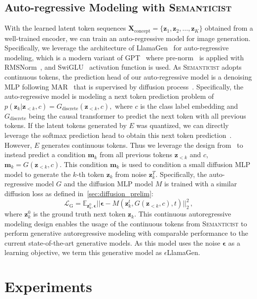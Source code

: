 \documentclass[10pt,twocolumn,letterpaper]{article}
\DeclareRobustCommand{\modelname}{\textsc{Semanticist}\xspace}
\DeclareRobustCommand{\armodelname}{$\epsilon$LlamaGen\xspace}
\begin{document}
\subsection{Auto-regressive Modeling with \bf\modelname}
With the learned latent token sequences $\bm{X}_{\text{concept}}=\{\bm{z}_1, \bm{z}_2, \dots, \bm{z}_K\}$ obtained from a well-trained encoder, we can train an auto-regressive model for image generation.
Specifically, we leverage the architecture of LlamaGen~\cite{llamagen} for auto-regressive modeling, which is a modern variant of GPT~\cite{radford2018improving} where pre-norm~\cite{prenorm} is applied with RMSNorm~\cite{rmsnorm}, and SwiGLU~\cite{swiglu} activation function is used.
As \modelname adopts continuous tokens, the prediction head of our auto-regressive model is a denoising MLP following MAR~\cite{mar} that is supervised by diffusion process~\cite{DDPM}.
Specifically, the auto-regressive model is modeling a next token prediction problem of $p(\bm{z}_k|\bm{z}_{<k}, c)=G_{\text{discrete}}(\bm{z}_{<k}, c),$ where $c$ is the class label embedding and $G_{\text{discrete}}$ being the causal transformer to predict the next token with all previous tokens.
If the latent tokens generated by $E$ was quantized, we can directly leverage the softmax prediction head to obtain this next token prediction~\cite{llamagen}.
However, $E$ generates continuous tokens. Thus we leverage the design from~\cite{mar} to instead predict a condition $\bm{m}_k$ from all previous tokens $\bm{z}_{<k}$ and $c$, $\bm{m}_k = G(\bm{z}_{<k}, c)$.
This condition $\bm{m}_k$ is used to condition a small diffusion MLP model to generate the $k$-th token $\bm{z}_k$ from noise $\bm{z}_k^T$.
Specifically, the auto-regressive model $G$ and the diffusion MLP model $M$ is trained with a similar diffusion loss as defined in~\cref{sec:diffusion_prelim}:
\begin{equation}
    \mathcal{L}_{\text{G}} = \mathbb{E}_{\bm{z}_k^0, \bm{\epsilon}}||\bm{\epsilon}-M(\bm{z}_k^t, G(\bm{z}_{<k}, c), t)||^2_2 \,, \nonumber
\end{equation}
where $\bm{z}_k^0$ is the ground truth next token $\bm{z}_k$.
This continuous autoregressive modeling design enables the usage of the continuous tokens from \modelname to perform generative autoregressive modeling with comparable performance to the current state-of-the-art generative models.
As this model uses the noise $\bm{\epsilon}$ as a learning objective, we term this generative model as \armodelname.

\section{Experiments}
\end{document}
